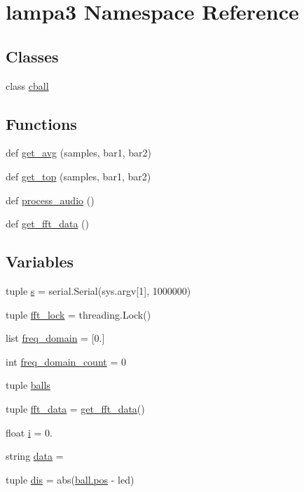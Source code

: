 \hypertarget{namespacelampa3}{}\section{lampa3 Namespace Reference}
\label{namespacelampa3}
\subsection*{Classes}
\begin{DoxyCompactItemize}
\item 
class \hyperlink{classlampa3_1_1cball}{cball}
\end{DoxyCompactItemize}
\subsection*{Functions}
\begin{DoxyCompactItemize}
\item 
def \hyperlink{namespacelampa3_aa0590cc862a5853961ca5fd86b7ac1fa}{get\+\_\+avg} (samples, bar1, bar2)
\item 
def \hyperlink{namespacelampa3_a7a40d7179c5361c18fa11333f6bed3de}{get\+\_\+top} (samples, bar1, bar2)
\item 
def \hyperlink{namespacelampa3_a51d280f262cc9ce82e86ea03d1a0c65e}{process\+\_\+audio} ()
\item 
def \hyperlink{namespacelampa3_a1f009a33d0f46ebbd311757b1be506e4}{get\+\_\+fft\+\_\+data} ()
\end{DoxyCompactItemize}
\subsection*{Variables}
\begin{DoxyCompactItemize}
\item 
tuple \hyperlink{namespacelampa3_a9fdf34c088d41a24177acb920b2fd18e}{s} = serial.\+Serial(sys.\+argv\mbox{[}1\mbox{]}, 1000000)
\item 
tuple \hyperlink{namespacelampa3_a80026bcfb224cd94af6d8ad60301e398}{fft\+\_\+lock} = threading.\+Lock()
\item 
list \hyperlink{namespacelampa3_aa47843cd430959c4ddc3a47b9227284f}{freq\+\_\+domain} = \mbox{[}0.\mbox{]}
\item 
int \hyperlink{namespacelampa3_ace298728f04f3d541eff23150215fb9d}{freq\+\_\+domain\+\_\+count} = 0
\item 
tuple \hyperlink{namespacelampa3_a55da923af35dbac285508a0406131512}{balls}
\item 
tuple \hyperlink{namespacelampa3_a3500d825a57d4f8db0ec5e03a08602d9}{fft\+\_\+data} = \hyperlink{namespacelampa3_a1f009a33d0f46ebbd311757b1be506e4}{get\+\_\+fft\+\_\+data}()
\item 
float \hyperlink{namespacelampa3_a18c385fc065e4af2e9dd2ae741f22cc8}{i} = 0.
\item 
string \hyperlink{namespacelampa3_ac5e38126a1577ce8442040ebcf143978}{data} = \textquotesingle{}\textquotesingle{}
\item 
tuple \hyperlink{namespacelampa3_a7efb0efcdd6c6602eb71b979d548ea6a}{dis} = abs(\hyperlink{sampling_8c_a1910d262855b71da353ed0d07a6c7823}{ball.\+pos} -\/ led)
\end{DoxyCompactItemize}


